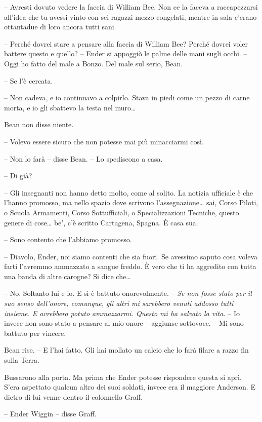 {-- Avresti dovuto vedere la faccia di William Bee. Non ce la faceva a
	raccapezzarsi all'idea che tu avessi vinto con sei ragazzi mezzo
	congelati, mentre in sala c'erano ottantadue di loro ancora tutti sani.}

{-- Perché dovrei stare a pensare alla faccia di William Bee? Perché
	dovrei voler battere questo e quello? -- Ender si appoggiò le palme
	delle mani sugli occhi. -- Oggi ho fatto del male a Bonzo. Del male sul
	serio, Bean.}

{-- Se l'è cercata.}

{-- Non cadeva, e io continuavo a colpirlo. Stava in piedi come un pezzo
	di carne morta, e io gli sbattevo la testa nel muro\ldots{}}

{Bean non disse niente.}

{-- Volevo essere sicuro che non potesse mai più minacciarmi così.}

{-- Non lo farà -- disse Bean. -- Lo spediscono a casa.}

{-- Di già?}

{-- Gli insegnanti non hanno detto molto, come al solito. La notizia
	ufficiale è che l'hanno promosso, ma nello spazio dove scrivono
	l'assegnazione\ldots{} sai, Corso Piloti, o Scuola Armamenti, Corso
	Sottufficiali, o Specializzazioni Tecniche, questo genere di
	cose\ldots{} be', c'è scritto Cartagena, Spagna. È casa sua.}

{-- Sono contento che l'abbiamo promosso.}

{-- Diavolo, Ender, noi siamo contenti che sia fuori. Se avessimo saputo
	cosa voleva farti l'avremmo ammazzato a sangue freddo. È vero che ti ha
	aggredito con tutta una banda di altre carogne? Si dice che\ldots{}}

{-- No. Soltanto lui e io. E si è battuto onorevolmente. -- \emph{Se non
		fosse stato per il suo senso dell'onore, comunque, gli altri mi
		sarebbero venuti addosso tutti insieme. E avrebbero potuto ammazzarmi.
		Questo mi ha salvato la vita.} -- Io invece non sono stato a pensare al
	mio onore -- aggiunse sottovoce. -- Mi sono battuto per vincere.}

{Bean rise. -- E l'hai fatto. Gli hai mollato un calcio che lo farà
	filare a razzo fin sulla Terra.}

{Bussarono alla porta. Ma prima che Ender potesse rispondere questa si
	aprì. S'era aspettato qualcun altro dei suoi soldati, invece era il
	maggiore Anderson. E dietro di lui venne dentro il colonnello Graff.}

{-- Ender Wiggin -- disse Graff.}

